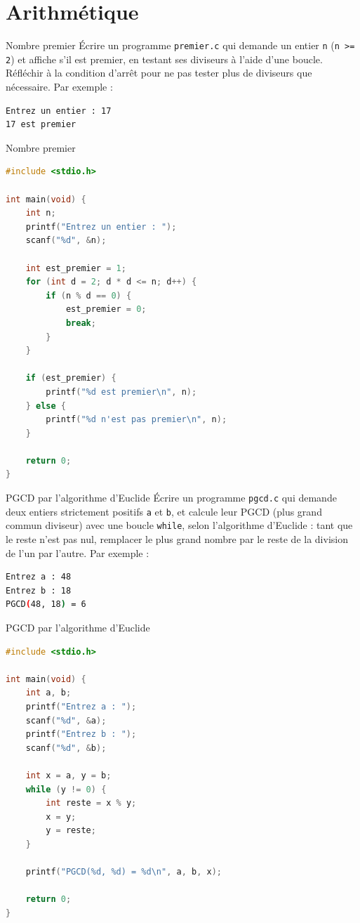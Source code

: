\section{Arithmétique}

\begin{UPSTIexercice}{Nombre premier}
	\UPSTIetape Écrire un programme \texttt{premier.c} qui demande un entier \texttt{n} (\texttt{n >= 2}) et affiche s'il est premier, en testant ses diviseurs à l'aide d'une boucle. Réfléchir à la condition d'arrêt pour ne pas tester plus de diviseurs que nécessaire.
	Par exemple :
	\begin{lstlisting}[language=bash,style=console]
Entrez un entier : 17
17 est premier
\end{lstlisting}
\end{UPSTIexercice}

\begin{UPSTIcorrectionP}{Nombre premier}
	\begin{lstlisting}[language=c]
#include <stdio.h>

int main(void) {
    int n;
    printf("Entrez un entier : ");
    scanf("%d", &n);

    int est_premier = 1;
    for (int d = 2; d * d <= n; d++) {
        if (n % d == 0) {
            est_premier = 0;
            break;
        }
    }

    if (est_premier) {
        printf("%d est premier\n", n);
    } else {
        printf("%d n'est pas premier\n", n);
    }

    return 0;
}
	\end{lstlisting}
\end{UPSTIcorrectionP}

\begin{UPSTIexercice}{PGCD par l'algorithme d'Euclide}
	\UPSTIetape Écrire un programme \texttt{pgcd.c} qui demande deux entiers strictement positifs \texttt{a} et \texttt{b}, et calcule leur PGCD (plus grand commun diviseur) avec une boucle \texttt{while}, selon l'algorithme d'Euclide : tant que le reste n'est pas nul, remplacer le plus grand nombre par le reste de la division de l'un par l'autre.
	Par exemple :
	\begin{lstlisting}[language=bash,style=console]
Entrez a : 48
Entrez b : 18
PGCD(48, 18) = 6
\end{lstlisting}
\end{UPSTIexercice}

\begin{UPSTIcorrectionP}{PGCD par l'algorithme d'Euclide}
	\begin{lstlisting}[language=c]
#include <stdio.h>

int main(void) {
    int a, b;
    printf("Entrez a : ");
    scanf("%d", &a);
    printf("Entrez b : ");
    scanf("%d", &b);

    int x = a, y = b;
    while (y != 0) {
        int reste = x % y;
        x = y;
        y = reste;
    }

    printf("PGCD(%d, %d) = %d\n", a, b, x);

    return 0;
}
	\end{lstlisting}
\end{UPSTIcorrectionP}


